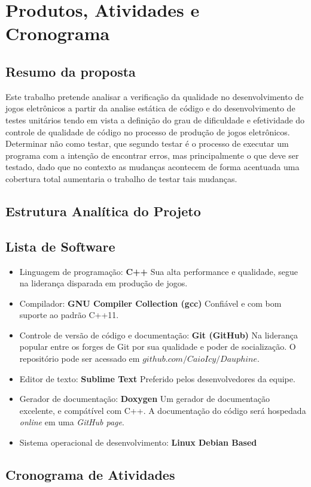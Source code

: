 \chapter[Produtos, Atividades e Cronograma]{Produtos, Atividades e Cronograma}

\section{Resumo da proposta}
	Este trabalho pretende analisar a verificação da qualidade no desenvolvimento de jogos eletrônicos a partir da analise estática de código e do desenvolvimento de testes unitários tendo em vista a definição do grau de dificuldade e efetividade do controle de qualidade de código no processo de produção de jogos eletrônicos.
	Determinar não como testar, que segundo  testar é o processo de executar um programa com a intenção de encontrar erros, mas principalmente o que deve ser testado, dado que no contexto as mudanças acontecem de forma acentuada uma cobertura total aumentaria o trabalho de testar tais mudanças.
\section{Estrutura Analítica do Projeto}
\section{Lista de Software}
\begin{itemize}
\item{Linguagem de programação:} \textbf{C++}
Sua alta performance e qualidade, segue na liderança disparada em produção de jogos.
\item{Compilador:} \textbf{GNU Compiler Collection (gcc)}
Confiável e com bom suporte ao padrão C++11.
\item{Controle de versão de código e documentação:} \textbf{Git (GitHub)}
Na liderança popular entre os forges de Git por sua qualidade e poder de socialização. O repositório pode ser acessado em $github.com/CaioIcy/Dauphine$.
\item{Editor de texto:} \textbf{Sublime Text}
Preferido pelos desenvolvedores da equipe.
\item{Gerador de documentação:} \textbf{Doxygen}
Um gerador de documentação excelente, e compátível com C++. A documentação do código será hospedada \textit{online} em uma \textit{GitHub page}.
\item{Sistema operacional de desenvolvimento:} \textbf{Linux Debian Based}
\end{itemize}
\section{Cronograma de Atividades}
